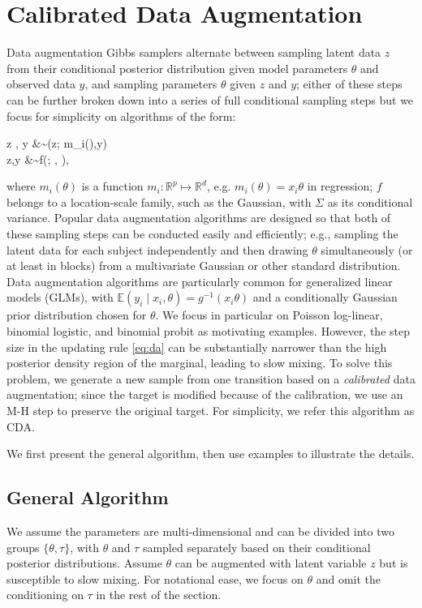 \documentclass[10pt]{article}
\newcommand{\be}{\begin{equs}}
\newcommand{\ee}{\end{equs}}
\newcommand{\bb}[1]{\mathbb{#1}}
\begin{document}
\section{Calibrated Data Augmentation}
Data augmentation Gibbs samplers alternate between sampling  latent data $z$ from their conditional posterior distribution given model parameters $\theta$ and observed data $y$, and sampling parameters $\theta$ given $z$ and $y$; either of these steps can be further broken down into a series of full conditional sampling steps but we focus for simplicity on algorithms of the form: 
\be \label{eq:da}
z \mid \theta, y &\sim \pi(z; m_i(\theta),y) \\
\theta \mid z,y &\sim f(\theta; \mu, \Sigma),
\ee
where  $m_i(\theta)$ is a function $m_i:\bb R^p \mapsto \bb R^d$, e.g.  $m_i (\theta) = x_i\theta$ in regression;  $f$ belongs to a location-scale family, such as the Gaussian, with $\Sigma$ as its conditional variance. Popular data augmentation algorithms are designed so that both of these sampling steps can be conducted easily and efficiently; e.g., sampling the latent data for each subject independently and then drawing $\theta$ simultaneously (or at least in blocks) from a multivariate Gaussian or other standard distribution.  Data augmentation algorithms are particularly common for generalized linear models (GLMs), with $\bb E(y_i \mid x_i, \theta) = g^{-1}(x_i \theta)$ and a conditionally Gaussian prior distribution chosen for $\theta$. We focus in particular on Poisson log-linear, binomial logistic, and binomial probit as motivating examples. However, the step size in the updating rule \eqref{eq:da} can be substantially narrower than the high posterior density region of the marginal, leading to slow mixing. To solve this problem, we generate a new sample from one transition based on a {\it calibrated} data augmentation; since the target is modified because of the calibration, we use an M-H step to preserve the original target. For simplicity, we refer this algorithm as CDA.

We first present the general algorithm, then use examples to illustrate the details.

 \subsection{General Algorithm}
 
We assume the parameters are multi-dimensional and can be divided into two groups $\{ \theta, \tau\}$, with $\theta$ and $\tau$ sampled separately based on their conditional posterior distributions.  Assume $\theta$ can be augmented with latent variable $z$ but is susceptible to slow mixing.  For notational ease, we focus on $\theta$ and omit the conditioning on $\tau$ in the rest of the section. %
\end{document}
